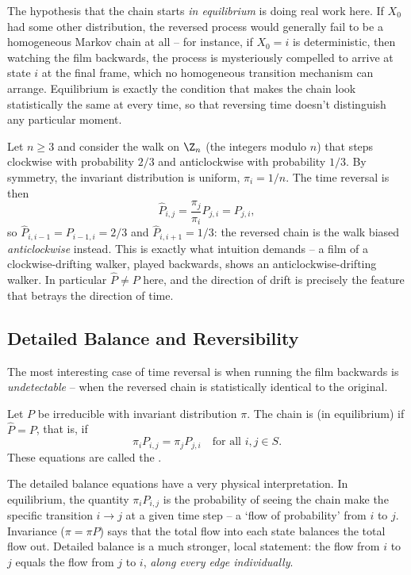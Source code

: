 \begin{remark}
	The hypothesis that the chain starts \emph{in equilibrium} is doing real work here. If $X_0$ had some other distribution, the reversed process would generally fail to be a homogeneous Markov chain at all -- for instance, if $X_0 = i$ is deterministic, then watching the film backwards, the process is mysteriously compelled to arrive at state $i$ at the final frame, which no homogeneous transition mechanism can arrange. Equilibrium is exactly the condition that makes the chain look statistically the same at every time, so that reversing time doesn't distinguish any particular moment.
\end{remark}

\begin{example}
	Let $n \geq 3$ and consider the walk on $\Z_n$ (the integers modulo $n$) that steps clockwise with probability $2/3$ and anticlockwise with probability $1/3$. By symmetry, the invariant distribution is uniform, $\pi_i = 1/n$. The time reversal is then
	$$
	\widehat{P}_{i, j} = \frac{\pi_j}{\pi_i}P_{j, i} = P_{j, i},
	$$
	so $\widehat{P}_{i, i - 1} = P_{i - 1, i} = 2/3$ and $\widehat{P}_{i, i + 1} = 1/3$: the reversed chain is the walk biased \emph{anticlockwise} instead. This is exactly what intuition demands -- a film of a clockwise-drifting walker, played backwards, shows an anticlockwise-drifting walker. In particular $\widehat{P} \neq P$ here, and the direction of drift is precisely the feature that betrays the direction of time.
\end{example}

\subsection{Detailed Balance and Reversibility}

The most interesting case of time reversal is when running the film backwards is \emph{undetectable} -- when the reversed chain is statistically identical to the original.

\begin{definition}[Reversibility]
	Let $P$ be irreducible with invariant distribution $\pi$. The chain is  (in equilibrium) if $\widehat{P} = P$, that is, if
	$$
	\pi_i P_{i, j} = \pi_j P_{j, i} \quad \text{for all } i, j \in S.
	$$
	These equations are called the .
\end{definition}

The detailed balance equations have a very physical interpretation. In equilibrium, the quantity $\pi_i P_{i, j}$ is the probability of seeing the chain make the specific transition $i \rightarrow j$ at a given time step -- a `flow of probability' from $i$ to $j$. Invariance ($\pi = \pi P$) says that the total flow into each state balances the total flow out. Detailed balance is a much stronger, local statement: the flow from $i$ to $j$ equals the flow from $j$ to $i$, \emph{along every edge individually}.

